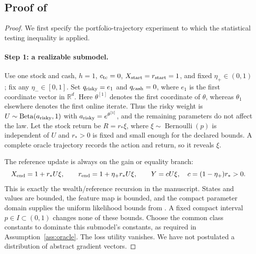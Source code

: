 \documentclass[11pt]{article}
\newcommand{\R}{\mathbb R}
\newcommand{\1}{\mathbf 1}
\begin{document}
\subsection{Proof of \texorpdfstring{}{the minimax theorem}}
\begin{proof}
We first specify the portfolio-trajectory experiment to which the statistical testing inequality is applied.

\paragraph{Step 1: a realizable submodel.}
Use one stock and cash, $h=1$, $c_{\rm tc}=0$, $X_{\rm start}=r_{\rm start}=1$, and fixed $\eta_+\in(0,1)$; fix any $\eta_-\in[0,1]$. Set $q_{\rm risky}=e_1$ and $q_{\rm cash}=0$, where $e_1$ is the first coordinate vector in $\R^d$. Here $\theta^{[1]}$ denotes the first coordinate of $\theta$, whereas $\theta_1$ elsewhere denotes the first online iterate. Thus the risky weight is $U\sim\operatorname{Beta}(a_{\rm risky},1)$ with $a_{\rm risky}=e^{\theta^{[1]}}$, and the remaining parameters do not affect the law. Let the stock return be $R=r_*\xi$, where $\xi\sim\operatorname{Bernoulli}(p)$ is independent of $U$ and $r_*>0$ is fixed and small enough for the declared bounds. A complete oracle trajectory records the action and return, so it reveals $\xi$.

The reference update is always on the gain or equality branch:
\[
 X_{\rm end}=1+r_*U\xi,\qquad
 r_{\rm end}=1+\eta_+r_*U\xi,\qquad
 Y=cU\xi,\quad c=(1-\eta_+)r_*>0.
\]
This is exactly the wealth/reference recursion in the manuscript. States and values are bounded, the feature map is bounded, and the compact parameter domain supplies the uniform likelihood bounds from . A fixed compact interval $p\in I\subset(0,1)$ changes none of these bounds. Choose the common class constants to dominate this submodel's constants, as required in Assumption~\ref{ass:oracle}. The loss utility vanishes. We have not postulated a distribution of abstract gradient vectors.


\end{proof}
\end{document}
